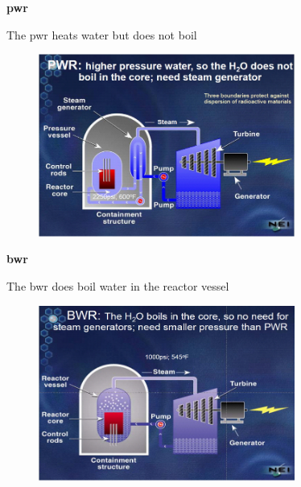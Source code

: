 \documentclass[aspectratio=1610,pdftex,dvipsnames,compress,xcolor={dvipsnames}]{beamer}
\newcommand{\acs}{\acrshort} %
\begin{document}
\begin{frame}[plain]{}
    \centering\LARGE\textbf{\acs{pwr}}
\end{frame}


\addtocounter{framenumber}{-1} 
\begin{frame}{The \acs{pwr} heats water but does not boil}
    \begin{figure}
        \centering
        \includegraphics[width=0.75\textwidth]{pwr.system.jpg}
    \end{figure}
\end{frame}


\begin{frame}[plain]{}
    \centering\LARGE\textbf{\acs{bwr}}
\end{frame}


\addtocounter{framenumber}{-1} 
\begin{frame}{The \acs{bwr} does boil water in the reactor vessel}
    \begin{figure}
        \centering
        \includegraphics[width=0.75\textwidth]{bwr.system.jpg}
    \end{figure}
\end{frame}
\end{document}
